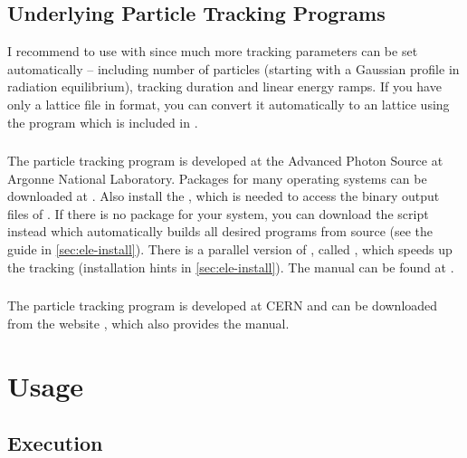 \documentclass[a4paper]{scrartcl}
\begin{document}
\subsection{Underlying Particle Tracking Programs}
\label{sec:elemadx}

I recommend to use \polem with \ele since much more tracking parameters can be set
automatically -- including number of particles (starting with a Gaussian profile in
radiation equilibrium), tracking duration and linear energy ramps. If you have only a
lattice file in \madx format, you can convert it automatically to an \ele lattice
using the program  which is included in \pal \cite{palattice}.

\subsubsection{\ele}
\label{sec:ele}
The particle tracking program \ele \cite{elegant} is developed at the Advanced Photon
Source at Argonne National Laboratory. Packages for many operating systems can be
downloaded at \cite{elegant-download}. Also install the , which is
needed to access the binary output files of \ele.
%
If there is no package for your system, you can download the 
script instead which automatically builds all desired programs from source (see the guide
in \cref{sec:ele-install}).
%
There is a parallel version of \ele, called , which speeds up the
tracking \cite{pelegant} (installation hints in \cref{sec:ele-install}). The \ele manual
can be found at \cite{elegant-manual}.

\subsubsection{\madx}
\label{sec:madx}
The particle tracking program \madx is developed at CERN and can be downloaded from the
website \cite{madx}, which also provides the \madx manual.




\section{Usage}
\label{sec:usage}

\subsection{Execution}
\label{sec:execution}
\end{document}
